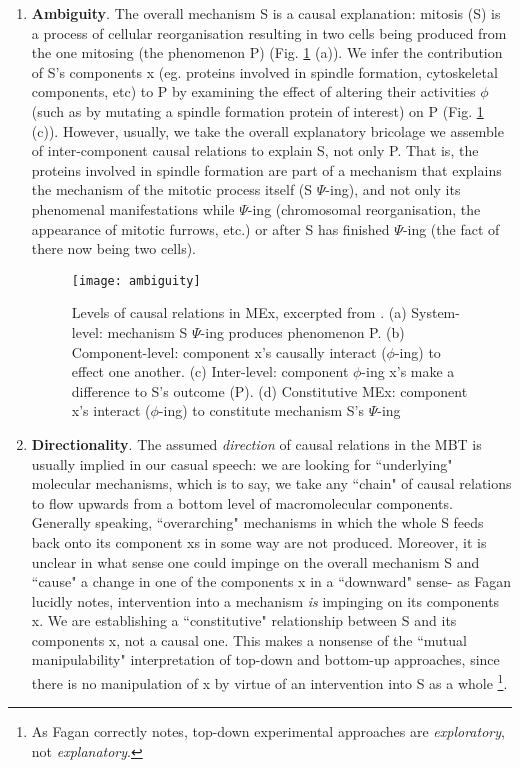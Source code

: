 \begin{enumerate}
\item  \textbf{Ambiguity}. The overall mechanism S is a causal explanation: mitosis (S) is a process of cellular reorganisation resulting in two cells being produced from the one mitosing (the phenomenon P) (Fig. \ref{fig:Ambiguity} (a)). We infer the contribution of S's components x (eg. proteins involved in spindle formation, cytoskeletal components, etc) to P by examining the effect of altering their activities $\phi$ (such as by mutating a spindle formation protein of interest) on P (Fig. \ref{fig:Ambiguity} (c)). However, usually, we take the overall explanatory bricolage we assemble of inter-component causal relations to explain S, not only P. That is, the proteins involved in spindle formation are part of a mechanism that explains the mechanism of the mitotic process itself (S $\Psi$-ing), and not only its phenomenal manifestations while $\Psi$-ing (chromosomal reorganisation, the appearance of mitotic furrows, etc.) or after S has finished $\Psi$-ing (the fact of there now being two cells).

\begin{figure}
\texttt{[image: ambiguity]}
\centering
\caption{Levels of causal relations in MEx, excerpted from \cite[p.102]{Fagan2013}.  (a) System-level: mechanism S $\Psi$-ing produces phenomenon P. (b) Component-level: component x's causally interact ($\phi$-ing) to effect one another. (c) Inter-level: component $\phi$-ing x's make a difference to S’s outcome (P). (d) Constitutive MEx: component x's interact ($\phi$-ing) to constitute mechanism S's $\Psi$-ing}
\label{fig:Ambiguity}
\end{figure}

\item \textbf{Directionality}. The assumed \textit{direction} of causal relations in the MBT is usually implied in our casual speech: we are looking for ``underlying" molecular mechanisms, which is to say, we take any ``chain" of causal relations to flow upwards from a bottom level of macromolecular components. Generally speaking, ``overarching" mechanisms in which the whole S feeds back onto its component xs in some way are not produced. Moreover, it is unclear in what sense one could impinge on the overall mechanism S and ``cause" a change in one of the components x in a ``downward" sense- as Fagan lucidly notes, intervention into a mechanism \textit{is} impinging on its components x\cite[p.103]{Fagan2013}. We are establishing a ``constitutive" relationship between S and its components x, not a causal one. This makes a nonsense of the ``mutual manipulability" interpretation of top-down and bottom-up approaches, since there is no manipulation of x by virtue of an intervention into S as a whole \footnote{As Fagan correctly notes, top-down experimental approaches are \textit{exploratory}, not \textit{explanatory}.}.


\end{enumerate}
